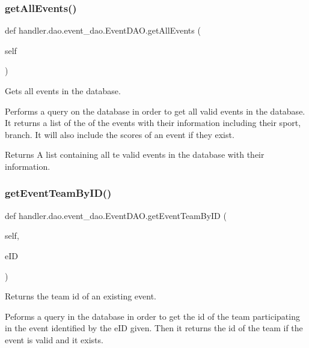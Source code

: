 \subsubsection{\texorpdfstring{get\+All\+Events()}{getAllEvents()}}
{\footnotesize\ttfamily def handler.\+dao.\+event\+\_\+dao.\+Event\+D\+A\+O.\+get\+All\+Events (\begin{DoxyParamCaption}\item[{}]{self }\end{DoxyParamCaption})}



Gets all events in the database. 

Performs a query on the database in order to get all valid events in the database. It returns a list of the of the events with their information including their sport, branch. It will also include the scores of an event if they exist. \begin{DoxyReturn}{Returns}
A list containing all te valid events in the database with their information. 
\end{DoxyReturn}
\mbox{\label{classhandler_1_1dao_1_1event__dao_1_1_event_d_a_o_a1f9f80d3b5442b3732c5cf63049cdd8c}} 
\subsubsection{\texorpdfstring{get\+Event\+Team\+By\+I\+D()}{getEventTeamByID()}}
{\footnotesize\ttfamily def handler.\+dao.\+event\+\_\+dao.\+Event\+D\+A\+O.\+get\+Event\+Team\+By\+ID (\begin{DoxyParamCaption}\item[{}]{self,  }\item[{}]{e\+ID }\end{DoxyParamCaption})}



Returns the team id of an existing event. 

Peforms a query in the database in order to get the id of the team participating in the event identified by the e\+ID given. Then it returns the id of the team if the event is valid and it exists.


